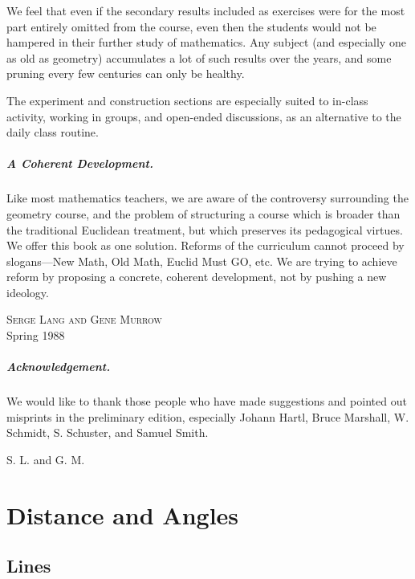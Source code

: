 \documentclass[12pt]{book} %
\begin{document}
We feel that even if the secondary results included as exercises were for the most part entirely omitted from the course, even then the students would not be hampered in their further study of mathematics. Any subject (and especially one as old as geometry) accumulates a lot of such results over the years, and some pruning every few centuries can only be healthy.

The experiment and construction sections are especially suited to in-class activity, working in groups, and open-ended discussions, as an alternative to the daily class routine.

\paragraph{A Coherent Development.}
Like most mathematics teachers, we are aware of the controversy surrounding the geometry course, and the problem of structuring a course which is broader than the traditional Euclidean treatment, but which preserves its pedagogical virtues. We offer this book as one solution. Reforms of the curriculum cannot proceed by slogans---New Math, Old Math, Euclid Must GO, etc. We are trying to achieve reform by proposing a concrete, coherent development, not by pushing a new ideology.

\begin{center}
	\textsc{Serge Lang and Gene Murrow}\\
	Spring 1988
\end{center}

\paragraph{Acknowledgement.}
We would like to thank those people who have made suggestions and pointed out misprints in the preliminary edition, especially Johann Hartl, Bruce Marshall, W. Schmidt, S. Schuster, and Samuel Smith.

\begin{flushright}
	S. L. and G. M.
\end{flushright}

\mainmatter

\chapter{Distance and Angles}

\section{Lines}
\end{document}
